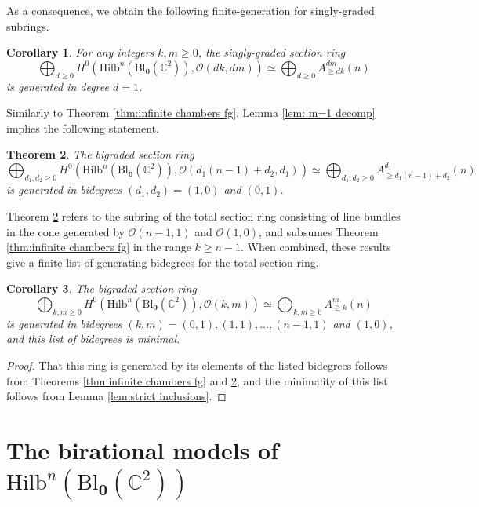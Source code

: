 \documentclass[12pt]{amsart}
\newcommand{\Hilb}{\mathrm{Hilb}}
\newcommand{\C}{\mathbb{C}}
\newcommand{\CO}{\mathcal{O}}
\newcommand{\Bl}{\mathrm{Bl}}
\numberwithin{equation}{section}
\newtheorem{theorem}{Theorem}[section]
\newtheorem{corollary}[theorem]{Corollary}
\theoremstyle{definition}
\begin{document}
As a consequence, we obtain the following finite-generation for singly-graded subrings.

\begin{corollary}\label{cor:fg on rays}
    For any integers $k,m\geq 0$, the singly-graded section ring 
    \[ \bigoplus_{d\geq 0} H^0\left(\Hilb^n\left(\Bl_{\mathbf{0}}\left(\C^2\right)\right),\CO(dk,dm)\right) \simeq \bigoplus_{d\geq 0} A^{dm}_{\geq dk}(n) \]
    is generated in degree $d = 1$.
\end{corollary}

 Similarly to Theorem \ref{thm:infinite chambers fg}, Lemma \ref{lem: m=1 decomp} implies the following statement.

\begin{theorem}\label{thm:finite chamber}
    The bigraded section ring
       \[ \bigoplus_{d_1,d_2\geq 0} H^0\left(\Hilb^n\left(\Bl_{\mathbf{0}}\left(\C^2\right)\right),\CO\left(d_1(n-1)+d_2,d_1\right)\right) \simeq \bigoplus_{d_1,d_2\geq 0} A^{d_1}_{\geq d_1(n-1)+d_2}(n) \]
    is generated in bidegrees $(d_1,d_2) = (1,0)$ and $(0,1)$.
\end{theorem}

Theorem \ref{thm:finite chamber} refers to the subring of the total section ring consisting of line bundles in the cone generated by $\CO(n-1,1)$ and $\CO(1,0)$, and subsumes Theorem \ref{thm:infinite chambers fg} in the range $k\geq n-1$. When combined, these results give a finite list of generating bidegrees for the total section ring.

\begin{corollary}\label{cor:finite generation degrees}
    The bigraded section ring 
    \[ \bigoplus_{k,m\geq 0} H^0(\Hilb^n(\Bl_{\mathbf{0}}(\C^2)),\CO(k,m)) \simeq \bigoplus_{k,m\geq 0} A^{m}_{\geq k}(n) \]
    is generated in bidegrees $(k,m)= (0,1),(1,1),\dots,(n-1,1)$ and $(1,0)$, and this list of bidegrees is minimal.
\end{corollary}


\begin{proof}
    That this ring is generated by its elements of the listed bidegrees follows from Theorems \ref{thm:infinite chambers fg} and \ref{thm:finite chamber}, and the minimality of this list follows from Lemma \ref{lem:strict inclusions}.
\end{proof}


\section{The birational models of $\Hilb^n(\Bl_{\mathbf{0}}(\C^2))$}\label{sec:proof of main thm}
\end{document}
